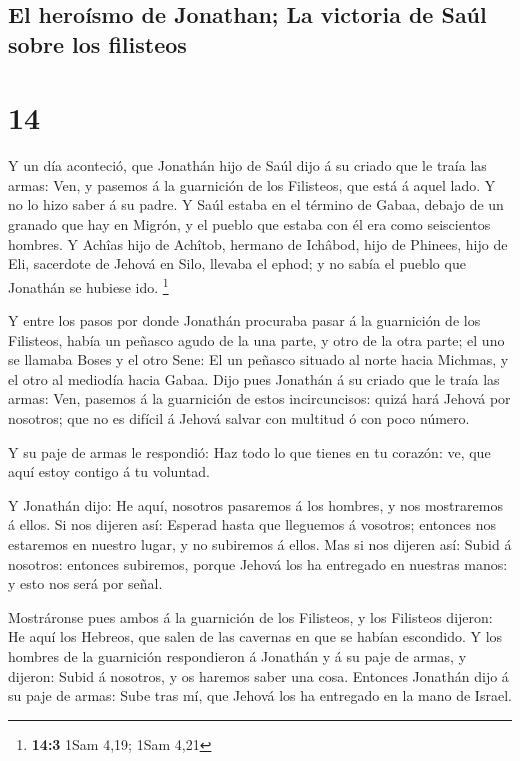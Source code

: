 \hypertarget{el-herouxedsmo-de-jonathan-la-victoria-de-sauxfal-sobre-los-filisteos}{%
\subsection{El heroísmo de Jonathan; La victoria de Saúl sobre los
filisteos}\label{el-herouxedsmo-de-jonathan-la-victoria-de-sauxfal-sobre-los-filisteos}}

\hypertarget{section-13}{%
\section{14}\label{section-13}}

 Y un día aconteció, que Jonathán hijo de Saúl dijo á su
criado que le traía las armas: Ven, y pasemos á la guarnición de los
Filisteos, que está á aquel lado. Y no lo hizo saber á su padre.
 Y Saúl estaba en el término de Gabaa, debajo de un
granado que hay en Migrón, y el pueblo que estaba con él era como
seiscientos hombres.  Y Achîas hijo de Achîtob, hermano de
Ichâbod, hijo de Phinees, hijo de Eli, sacerdote de Jehová en Silo,
llevaba el ephod; y no sabía el pueblo que Jonathán se hubiese ido.
\footnote{\textbf{14:3} 1Sam 4,19; 1Sam 4,21}

 Y entre los pasos por donde Jonathán procuraba pasar á la
guarnición de los Filisteos, había un peñasco agudo de la una parte, y
otro de la otra parte; el uno se llamaba Boses y el otro Sene:
 El un peñasco situado al norte hacia Michmas, y el otro
al mediodía hacia Gabaa.  Dijo pues Jonathán á su criado
que le traía las armas: Ven, pasemos á la guarnición de estos
incircuncisos: quizá hará Jehová por nosotros; que no es difícil á
Jehová salvar con multitud ó con poco número.

 Y su paje de armas le respondió: Haz todo lo que tienes
en tu corazón: ve, que aquí estoy contigo á tu voluntad.

 Y Jonathán dijo: He aquí, nosotros pasaremos á los
hombres, y nos mostraremos á ellos.  Si nos dijeren así:
Esperad hasta que lleguemos á vosotros; entonces nos estaremos en
nuestro lugar, y no subiremos á ellos.  Mas si nos
dijeren así: Subid á nosotros: entonces subiremos, porque Jehová los ha
entregado en nuestras manos: y esto nos será por señal.

 Mostráronse pues ambos á la guarnición de los Filisteos,
y los Filisteos dijeron: He aquí los Hebreos, que salen de las cavernas
en que se habían escondido.  Y los hombres de la
guarnición respondieron á Jonathán y á su paje de armas, y dijeron:
Subid á nosotros, y os haremos saber una cosa. Entonces Jonathán dijo á
su paje de armas: Sube tras mí, que Jehová los ha entregado en la mano
de Israel.

